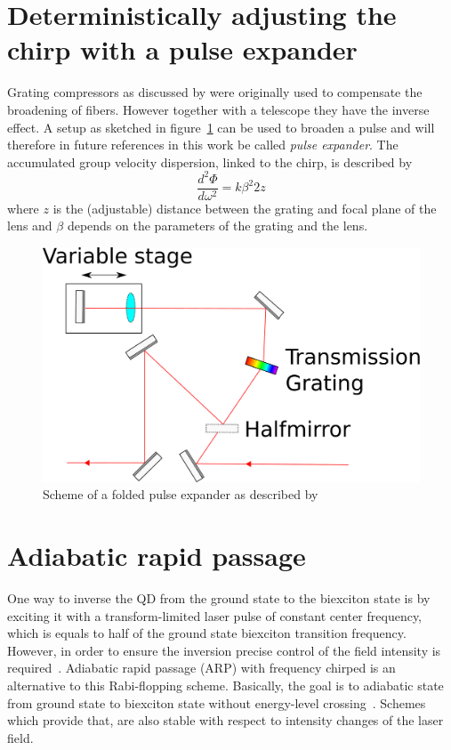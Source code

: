 \section{Deterministically adjusting the chirp with a pulse expander}
\label{sec:pulse-expander}
Grating compressors as discussed by \textcite{martinez_3000_1987} were originally used to compensate the broadening of fibers.
However together with a telescope they have the inverse effect.
A setup as sketched in figure~\ref{fig:pulse-expander} can be used to broaden a pulse and will therefore in future references in this work be called \textit{pulse expander}.
The accumulated group velocity dispersion, linked to the chirp, is described by
\begin{equation}
\frac{d^2 \Phi}{d \omega^2} = k \beta^2 2 z
\end{equation}
where $z$ is the (adjustable) distance between the grating and focal plane of the lens and $\beta$ depends on the parameters of the grating and the lens.

\begin{figure}[H]
	\centering
	\includegraphics[width=0.7\linewidth]{figures/chirp/pulse-expander}
	\caption{Scheme of a folded pulse expander as described by \textcite{martinez_3000_1987}}
	\label{fig:pulse-expander}
\end{figure}

\section{Adiabatic rapid passage}
One way to inverse the \ac{QD} from the ground state to the biexciton state is by exciting it with a transform-limited laser pulse of constant center frequency, which is equals to half of the ground state biexciton transition frequency.
However, in order to ensure the inversion precise control of the field intensity is required~\cite{glassl_biexciton_2013}.
Adiabatic rapid passage  (\acs{ARP}) with frequency chirped is an alternative to this Rabi-flopping scheme.
Basically, the goal is to adiabatic state from ground state to biexciton state without energy-level crossing~\cite{hui_proposal_2008}.
Schemes which provide that, are also stable with respect to intensity changes of the laser field.

